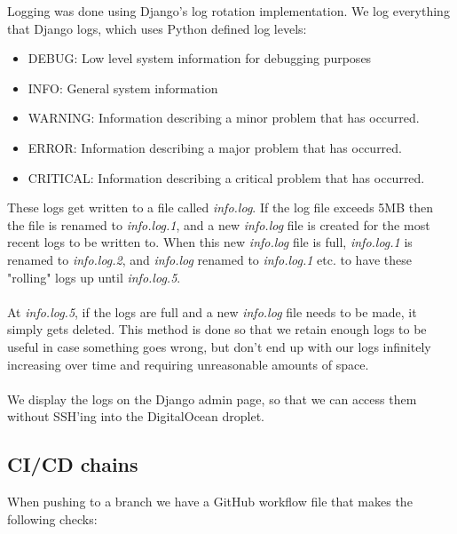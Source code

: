 Logging was done using Django's log rotation implementation. We log everything that Django logs, which uses Python defined log levels:

\begin{itemize}
    \item DEBUG: Low level system information for debugging purposes
    \item INFO: General system information
    \item WARNING: Information describing a minor problem that has occurred.
    \item ERROR: Information describing a major problem that has occurred.
    \item CRITICAL: Information describing a critical problem that has occurred.
\end{itemize}

These logs get written to a file called \textit{info.log}. If the log file exceeds 5MB then the file is renamed to \textit{info.log.1}, and a new \textit{info.log} file is created for the most recent logs to be written to. When this new \textit{info.log} file is full, \textit{info.log.1} is renamed to \textit{info.log.2}, and \textit{info.log} renamed to \textit{info.log.1} etc. to have these "rolling" logs up until \textit{info.log.5}.
\\\\
At \textit{info.log.5}, if the logs are full and a new \textit{info.log} file needs to be made, it simply gets deleted. This method is done so that we retain enough logs to be useful in case something goes wrong, but don't end up with our logs infinitely increasing over time and requiring unreasonable amounts of space.
\\\\
We display the logs on the Django admin page, so that we can access them without SSH'ing into the DigitalOcean droplet.

\subsection*{CI/CD chains}


When pushing to a branch we have a GitHub workflow file that makes the following checks:

